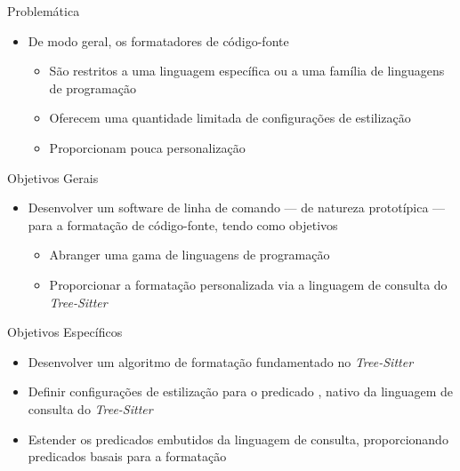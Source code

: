 \documentclass
  [ aspectratio=169,
    english,
    hyperref={citecolor=blue,colorlinks=true,linkcolor=blue,urlcolor=blue},
    brazil]
  {beamer}
\newcommand{\treesitter}{\textit{Tree-Sitter}\xspace}
\begin{document}

  \begin{frame}{Problemática}
    \begin{itemize}
      \item De modo geral, os formatadores de código-fonte
            \begin{itemize}
              \item São restritos a uma linguagem específica ou a uma família
                    de linguagens de programação
              \item Oferecem uma quantidade limitada de configurações de
                    estilização
              \item Proporcionam pouca personalização
            \end{itemize}
    \end{itemize}
  \end{frame}


  \begin{frame}{Objetivos Gerais}
    \begin{itemize}
      \item Desenvolver um software de linha de comando --- de natureza
            prototípica --- para a formatação de código-fonte, tendo como
            objetivos
            \begin{itemize}
              \item Abranger uma gama de linguagens de programação
              \item Proporcionar a formatação personalizada via a linguagem de
                    consulta do \treesitter
            \end{itemize}
    \end{itemize}
  \end{frame}


  \begin{frame}[fragile]{Objetivos Específicos}
    \begin{itemize}
      \item Desenvolver um algoritmo de formatação fundamentado no \treesitter
      \item Definir configurações de estilização para o predicado
            , nativo da linguagem de consulta do
            \treesitter
      \item Estender os predicados embutidos da linguagem de consulta,
            proporcionando predicados basais para a formatação
    \end{itemize}
  \end{frame}
\end{document}
